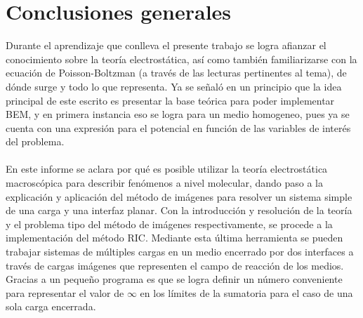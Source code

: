 \documentclass[12pt, notitlepage]{article}
\begin{document}


\section{Conclusiones generales}
Durante el aprendizaje que conlleva el presente trabajo se logra afianzar el conocimiento sobre la teoría electrostática, así como también familiarizarse con la ecuación de Poisson-Boltzman (a través de las lecturas pertinentes al tema), de dónde surge y todo lo que representa. Ya se señaló en un principio que la idea principal de este escrito es presentar la base teórica para poder implementar BEM, y en primera instancia eso se logra para un medio homogeneo, pues ya se cuenta con una expresión para el potencial en función de las variables de interés del problema.\\\\
En este informe se aclara por qué es posible utilizar la teoría electrostática macroscópica para describir fenómenos a nivel molecular, dando paso a la explicación y aplicación del método de imágenes para resolver un sistema simple de una carga y una interfaz planar. Con la introducción y resolución de la teoría y el problema tipo del método de imágenes respectivamente, se procede a la implementación del método RIC. Mediante esta última herramienta se pueden trabajar sistemas de múltiples cargas en un medio encerrado por dos interfaces a través de cargas imágenes que representen el campo de reacción de los medios. Gracias a un pequeño programa es que se logra definir un número conveniente para representar el valor de $\infty$ en los límites de la sumatoria para el caso de una sola carga encerrada.
\end{document}
